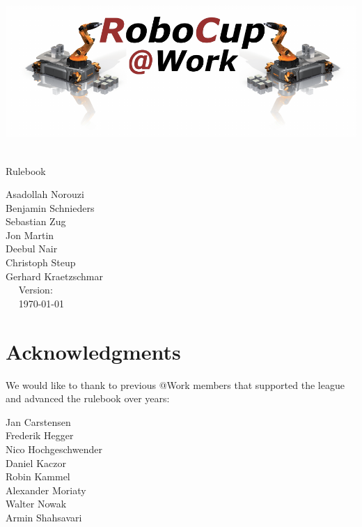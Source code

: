 
\begin{titlepage}
  \begin{center}
    {

      \includegraphics[width=\textwidth]{images/logo_RoboCupAtWork.pdf}\\[1.23ex]
    }
    \vspace{2.7 cm}
    \hrulefill\par
    {%
      \vspace*{.27cm}
      \Huge{\RCAW}\\[1.23ex]
      \Large Rulebook \\[2ex]
    }




    \hrulefill\par

    \vfill
    Asadollah Norouzi\\
  	Benjamin Schnieders\\
  	Sebastian Zug\\
    Jon Martin \\
    Deebul Nair \\
    Christoph Steup \\
  	Gerhard Kraetzschmar\\
    \vfill
    ~~ Version: \YEAR ~~ \\
    ~~  \today ~~ \\
  \end{center}

\newpage

\section*{Acknowledgments}

We would like to thank to previous @Work members that supported the league and
advanced the rulebook over years:

Jan Carstensen \\
Frederik Hegger\\
Nico Hochgeschwender \\
Daniel Kaczor \\
Robin Kammel \\
Alexander Moriaty \\
Walter Nowak \\
Armin Shahsavari \\



\end{titlepage}
